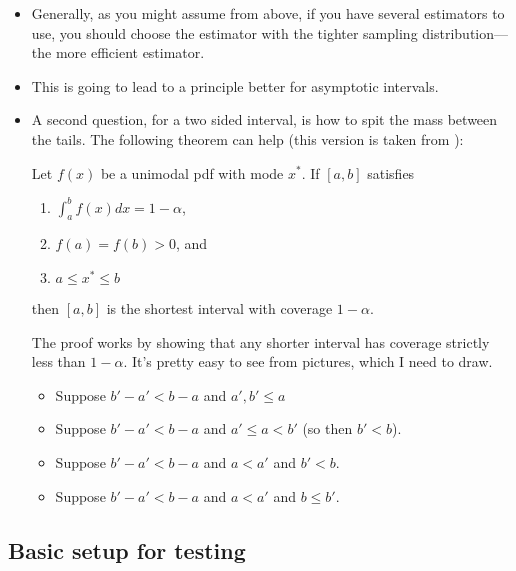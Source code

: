 \begin{itemize}[leftmargin=0pt]

\item Generally, as you might assume from above, if you have several
  estimators to use, you should choose the estimator with the tighter
  sampling distribution---the more efficient estimator.

\item This is going to lead to a principle better for asymptotic
  intervals.

\item A second question, for a two sided interval, is how to spit the
  mass between the tails.  The following theorem can help (this
  version is taken from \citealp{CB02}):

  \begin{thm}
    Let $f(x)$ be a unimodal pdf with mode $x^*$.  If $[a,b]$
    satisfies
    \begin{enumerate}
    \item $\int_a^b f(x) dx = 1 - \alpha$,
    \item $f(a) = f(b) > 0$, and
    \item $a \leq x^* \leq b$
    \end{enumerate}
    then $[a,b]$ is the shortest interval with coverage $1-\alpha$.
  \end{thm}

  The proof works by showing that any shorter interval has coverage
  strictly less than $1-\alpha$.  It's pretty easy to see from pictures,
  which I need to draw.

  \begin{itemize}
  \item Suppose $b'-a' < b-a$ and $a', b' \leq a$
  \item Suppose $b'-a' < b-a$ and $a' \leq a < b'$ (so then $b' < b$).
  \item Suppose $b'-a' < b-a$ and $a < a'$ and $b' < b$.
  \item Suppose $b'-a' < b-a$ and $a < a'$ and $b \leq b'$.
  \end{itemize}

\end{itemize}

\subsection{Basic setup for testing}

